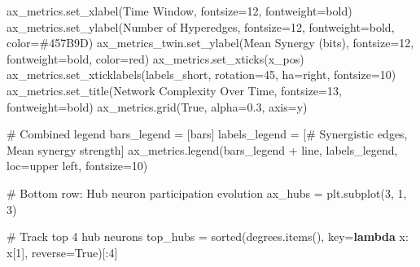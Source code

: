 \documentclass[
  11pt,
  letterpaper,
  oneside,
  openany]{book}
\newenvironment{Shaded}{\begin{snugshade}}{\end{snugshade}}
\newcommand{\BuiltInTok}[1]{\textcolor[rgb]{0.00,0.23,0.31}{#1}}
\newcommand{\CommentTok}[1]{\textcolor[rgb]{0.37,0.37,0.37}{#1}}
\newcommand{\DecValTok}[1]{\textcolor[rgb]{0.68,0.00,0.00}{#1}}
\newcommand{\FloatTok}[1]{\textcolor[rgb]{0.68,0.00,0.00}{#1}}
\newcommand{\KeywordTok}[1]{\textcolor[rgb]{0.00,0.23,0.31}{\textbf{#1}}}
\newcommand{\NormalTok}[1]{\textcolor[rgb]{0.00,0.23,0.31}{#1}}
\newcommand{\OperatorTok}[1]{\textcolor[rgb]{0.37,0.37,0.37}{#1}}
\newcommand{\StringTok}[1]{\textcolor[rgb]{0.13,0.47,0.30}{#1}}
\newcommand{\VariableTok}[1]{\textcolor[rgb]{0.07,0.07,0.07}{#1}}
\begin{document}
\begin{Shaded}
\begin{Highlighting}[]
\NormalTok{ax\_metrics.set\_xlabel(}\StringTok{\textquotesingle{}Time Window\textquotesingle{}}\NormalTok{, fontsize}\OperatorTok{=}\DecValTok{12}\NormalTok{, fontweight}\OperatorTok{=}\StringTok{\textquotesingle{}bold\textquotesingle{}}\NormalTok{)}
\NormalTok{ax\_metrics.set\_ylabel(}\StringTok{\textquotesingle{}Number of Hyperedges\textquotesingle{}}\NormalTok{, fontsize}\OperatorTok{=}\DecValTok{12}\NormalTok{, fontweight}\OperatorTok{=}\StringTok{\textquotesingle{}bold\textquotesingle{}}\NormalTok{, color}\OperatorTok{=}\StringTok{\textquotesingle{}\#457B9D\textquotesingle{}}\NormalTok{)}
\NormalTok{ax\_metrics\_twin.set\_ylabel(}\StringTok{\textquotesingle{}Mean Synergy (bits)\textquotesingle{}}\NormalTok{, fontsize}\OperatorTok{=}\DecValTok{12}\NormalTok{, fontweight}\OperatorTok{=}\StringTok{\textquotesingle{}bold\textquotesingle{}}\NormalTok{, color}\OperatorTok{=}\StringTok{\textquotesingle{}red\textquotesingle{}}\NormalTok{)}
\NormalTok{ax\_metrics.set\_xticks(x\_pos)}
\NormalTok{ax\_metrics.set\_xticklabels(labels\_short, rotation}\OperatorTok{=}\DecValTok{45}\NormalTok{, ha}\OperatorTok{=}\StringTok{\textquotesingle{}right\textquotesingle{}}\NormalTok{, fontsize}\OperatorTok{=}\DecValTok{10}\NormalTok{)}
\NormalTok{ax\_metrics.set\_title(}\StringTok{\textquotesingle{}Network Complexity Over Time\textquotesingle{}}\NormalTok{, fontsize}\OperatorTok{=}\DecValTok{13}\NormalTok{, fontweight}\OperatorTok{=}\StringTok{\textquotesingle{}bold\textquotesingle{}}\NormalTok{)}
\NormalTok{ax\_metrics.grid(}\VariableTok{True}\NormalTok{, alpha}\OperatorTok{=}\FloatTok{0.3}\NormalTok{, axis}\OperatorTok{=}\StringTok{\textquotesingle{}y\textquotesingle{}}\NormalTok{)}

\CommentTok{\# Combined legend}
\NormalTok{bars\_legend }\OperatorTok{=}\NormalTok{ [bars]}
\NormalTok{labels\_legend }\OperatorTok{=}\NormalTok{ [}\StringTok{\textquotesingle{}\# Synergistic edges\textquotesingle{}}\NormalTok{, }\StringTok{\textquotesingle{}Mean synergy strength\textquotesingle{}}\NormalTok{]}
\NormalTok{ax\_metrics.legend(bars\_legend }\OperatorTok{+}\NormalTok{ line, labels\_legend, loc}\OperatorTok{=}\StringTok{\textquotesingle{}upper left\textquotesingle{}}\NormalTok{, fontsize}\OperatorTok{=}\DecValTok{10}\NormalTok{)}

\CommentTok{\# Bottom row: Hub neuron participation evolution}
\NormalTok{ax\_hubs }\OperatorTok{=}\NormalTok{ plt.subplot(}\DecValTok{3}\NormalTok{, }\DecValTok{1}\NormalTok{, }\DecValTok{3}\NormalTok{)}

\CommentTok{\# Track top 4 hub neurons}
\NormalTok{top\_hubs }\OperatorTok{=} \BuiltInTok{sorted}\NormalTok{(degrees.items(), key}\OperatorTok{=}\KeywordTok{lambda}\NormalTok{ x: x[}\DecValTok{1}\NormalTok{], reverse}\OperatorTok{=}\VariableTok{True}\NormalTok{)[:}\DecValTok{4}\NormalTok{]}


\end{Highlighting}
\end{Shaded}
\end{document}
